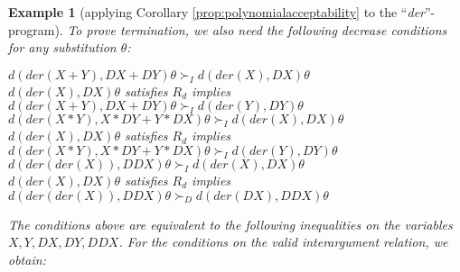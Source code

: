 \documentclass[envcountsame]{tlp}
\newcounter{ex:der-lastsymconsctr}
\newtheorem{example}{Example}
\begin{document}
\begin{example}[applying Corollary \ref{prop:polynomialacceptability} to the
``\textit{der}''-program]
To prove termination, we also need the following decrease conditions for any substitution
$\theta$:
\begin{center}
    $d(\mathit{der}(X+Y),\mathit{DX}+\mathit{DY})\theta  \succ_I
d(\mathit{der}(X),\mathit{DX})\theta$\\\vspace{2mm}
    $d(\mathit{der}(X),\mathit{DX})\theta$ satisfies $R_{d}$ implies \\
$d(\mathit{der}(X+Y),\mathit{DX}+\mathit{DY})\theta \succ_I d(\mathit{der}(Y),\mathit{DY})\theta$\\\vspace{2mm}
    $d(\mathit{der}(X*Y),X*\mathit{DY}+Y*\mathit{DX})\theta \succ_I d(\mathit{der}(X),\mathit{DX})\theta$\\\vspace{2mm}
    $d(\mathit{der}(X),\mathit{DX})\theta$ satisfies $R_{d}$ implies \\
$d(\mathit{der}(X*Y),X*\mathit{DY}+Y*\mathit{DX})\theta \succ_I 
d(\mathit{der}(Y),\mathit{DY})\theta$\\\vspace{2mm}
    $d(\mathit{der}(\mathit{der}(X)),\mathit{DDX})\theta \succ_I d(\mathit{der}(X),\mathit{DX})\theta$\\\vspace{2mm}
    $d(\mathit{der}(X),\mathit{DX})\theta$ satisfies $R_{d}$ implies \\
$d(\mathit{der}(\mathit{der}(X)),\mathit{DDX})\theta \succ_D d(\mathit{der}(\mathit{DX}),\mathit{DDX})\theta$
\end{center}

The conditions above 
are equivalent to the following inequalities on the
variables $X, Y, \mathit{DX}, \mathit{DY}, \mathit{DDX}$. For the conditions on the valid interargument
relation, we obtain:

\vspace*{-.4cm}


\end{example}
\end{document}
